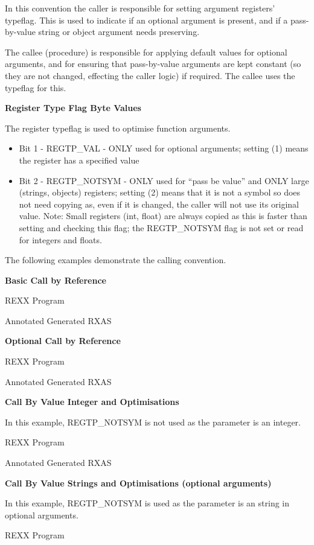 In this convention the caller is responsible for setting argument
registers' typeflag. This is used to indicate if an optional argument is
present, and if a pass-by-value string or object argument needs
preserving.

The callee (procedure) is responsible for applying default values for
optional arguments, and for ensuring that pass-by-value arguments are
kept constant (so they are not changed, effecting the caller logic) if
required. The callee uses the typeflag for this.

\textbf{Register Type Flag Byte Values}

The register typeflag is used to optimise function arguments.

\begin{itemize}
\item
  Bit 1 - REGTP\_VAL - ONLY used for optional arguments; setting (1)
  means the register has a specified value
\item
  Bit 2 - REGTP\_NOTSYM - ONLY used for ``pass be value'' and ONLY large
  (strings, objects) registers; setting (2) means that it is not a
  symbol so does not need copying as, even if it is changed, the caller
  will not use its original value. Note: Small registers (int, float)
  are always copied as this is faster than setting and checking this
  flag; the REGTP\_NOTSYM flag is not set or read for integers and
  floats.
\end{itemize}

The following examples demonstrate the calling convention.

\textbf{Basic Call by Reference}

REXX Program

Annotated Generated RXAS

\textbf{Optional Call by Reference}

REXX Program

Annotated Generated RXAS

\textbf{Call By Value Integer and Optimisations}

In this example, REGTP\_NOTSYM is not used as the parameter is an
integer.

REXX Program

Annotated Generated RXAS

\textbf{Call By Value Strings and Optimisations (optional arguments)}

In this example, REGTP\_NOTSYM is used as the parameter is an string in
optional arguments.

REXX Program

